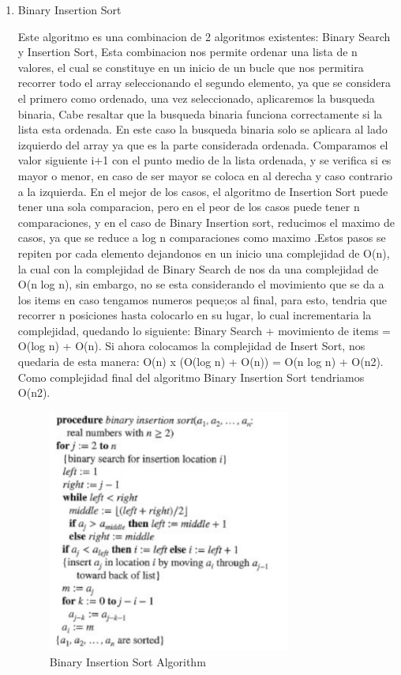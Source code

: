 \documentclass[12pt]{article} %
\begin{document}
\begin{enumerate}
    \item Binary Insertion Sort
        
        Este algoritmo es una combinacion de 2 algoritmos existentes: Binary Search y Insertion Sort,
        Esta combinacion nos permite ordenar una lista de n valores, el cual se constituye en un inicio de un bucle que nos permitira recorrer todo el array
        seleccionando el segundo elemento, ya que se considera el primero como ordenado, una vez seleccionado, aplicaremos la busqueda binaria, Cabe resaltar que la busqueda binaria funciona correctamente si la lista esta ordenada.
        En este caso la busqueda binaria solo se aplicara al lado izquierdo del array ya que es la parte considerada ordenada. Comparamos el valor siguiente i+1 con el punto medio de la lista ordenada,
        y se verifica si es mayor o menor, en caso de ser mayor se coloca en al derecha y caso contrario a la izquierda. En el mejor de los casos, el algoritmo de Insertion Sort puede tener una sola comparacion, pero en el peor
        de los casos puede tener n comparaciones, y en el caso de Binary Insertion sort, reducimos el maximo de casos, ya que se reduce a log n comparaciones como maximo .Estos pasos se repiten por cada elemento dejandonos en un inicio una complejidad de O(n),
        la cual con la complejidad de Binary Search de nos da una complejidad de O(n log n), sin embargo, no se esta considerando el movimiento que se da a los items en caso tengamos numeros peque;os al final, para esto, tendria que recorrer
        n posiciones hasta colocarlo en su lugar, lo cual incrementaria la complejidad, quedando lo siguiente: Binary Search + movimiento de items = O(log n) + O(n). Si ahora colocamos la complejidad de Insert Sort, nos quedaria de esta manera:
        O(n) x (O(log n) + O(n)) = O(n log n) + O(n2). Como complejidad final del algoritmo Binary Insertion Sort tendriamos O(n2).

        \begin{figure}[H]
        \centering
        \includegraphics[width=8cm, height=8cm]{binaryinsertionsort_pseudocode}
        \caption{Binary Insertion Sort Algorithm}
        \end{figure}


\end{enumerate}
\end{document}
